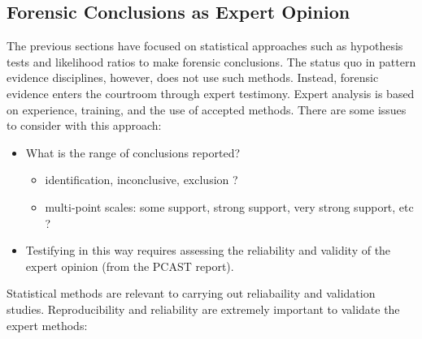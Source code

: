 \documentclass[]{book}
\providecommand{\tightlist}{%
  \setlength{\itemsep}{0pt}\setlength{\parskip}{0pt}}
\theoremstyle{definition}
\theoremstyle{definition}
\theoremstyle{remark}
\begin{document}
\subsection{Forensic Conclusions as Expert
Opinion}\label{forensic-conclusions-as-expert-opinion}

The previous sections have focused on statistical approaches such as
hypothesis tests and likelihood ratios to make forensic conclusions. The
status quo in pattern evidence disciplines, however, does not use such
methods. Instead, forensic evidence enters the courtroom through expert
testimony. Expert analysis is based on experience, training, and the use
of accepted methods. There are some issues to consider with this
approach:

\begin{itemize}
\tightlist
\item
  What is the range of conclusions reported?

  \begin{itemize}
  \tightlist
  \item
    identification, inconclusive, exclusion ?
  \item
    multi-point scales: some support, strong support, very strong
    support, etc ?
  \end{itemize}
\item
  Testifying in this way requires assessing the reliability and validity
  of the expert opinion (from the PCAST report).
\end{itemize}

Statistical methods are relevant to carrying out reliabaility and
validation studies. Reproducibility and reliability are extremely
important to validate the expert methods:
\end{document}
